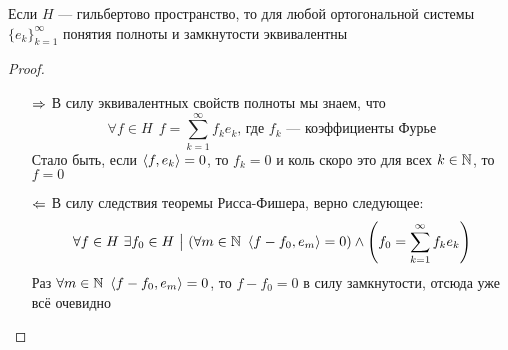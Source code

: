 \begin{theorem}
	Если $H$ --- гильбертово пространство, то для любой ортогональной системы $\{e_k\}_{k = 1}^\infty$ понятия полноты и замкнутости эквивалентны
\end{theorem}

\begin{proof}~
	\begin{itemize}
		\item[$\Rightarrow$] В силу эквивалентных свойств полноты мы знаем, что
		\[
			\forall f \in H\ \ f = \sum_{k = 1}^\infty f_ke_k \text{, где $f_k$ --- коэффициенты Фурье}
		\]
		Стало быть, если $\left\langle f, e_k\right\rangle = 0$, то $f_k = 0$ и коль скоро это для всех $k \in \mathbb{N}$, то $f = 0$
		
		\item[$\Leftarrow$] В силу следствия теоремы Рисса-Фишера, верно следующее:
		\[
			\forall f \in H\ \exists f_0 \in H \ \big|\  (\forall m \in \mathbb{N}\ \left\langle f - f_0, e_m\right\rangle = 0) \wedge \left(f_0 = \sum_{k = 1}^\infty f_ke_k\right)
		\]
		Раз $\forall m \in \mathbb{N}\ \left\langle f - f_0, e_m\right\rangle = 0$, то $f - f_0 = 0$ в силу замкнутости, отсюда уже всё очевидно
	\end{itemize}
\end{proof}